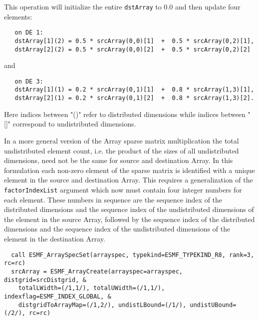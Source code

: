 
   This operation will initialize the entire {\tt dstArray} to 0.0 and then 
   update four elements:
  
   \begin{verbatim}
   on DE 1:
   dstArray[1](2) = 0.5 * srcArray(0,0)[1]  +  0.5 * srcArray(0,2)[1],
   dstArray[2](2) = 0.5 * srcArray(0,0)[2]  +  0.5 * srcArray(0,2)[2]
   \end{verbatim}
  
   and
  
   \begin{verbatim}
   on DE 3:
   dstArray[1](1) = 0.2 * srcArray(0,1)[1]  +  0.8 * srcArray(1,3)[1],
   dstArray[2](1) = 0.2 * srcArray(0,1)[2]  +  0.8 * srcArray(1,3)[2].
   \end{verbatim}
  
   Here indices between "()" refer to distributed dimensions while indices
   between "[]" correspond to undistributed dimensions. 

   In a more general version of the Array sparse matrix multiplication the
   total undistributed element count, i.e. the product of the sizes 
   of all undistributed dimensions, need not be the same for source and
   destination Array. In this formulation each non-zero element of the sparse
   matrix is identified with a unique element in the source and destination
   Array. This requires a generalization of the {\tt factorIndexList} argument
   which now must contain four integer numbers for each element. These numbers
   in sequence are the sequence index of the distributed dimensions and the
   sequence index of the undistributed dimensions of the element in the source
   Array, followed by the sequence index of the distributed dimensions and
   the sequence index of the undistributed dimensions of the element in the
   destination Array. 

 \begin{verbatim}
  call ESMF_ArraySpecSet(arrayspec, typekind=ESMF_TYPEKIND_R8, rank=3, rc=rc)
  srcArray = ESMF_ArrayCreate(arrayspec=arrayspec, distgrid=srcDistgrid, &
    totalLWidth=(/1,1/), totalUWidth=(/1,1/), indexflag=ESMF_INDEX_GLOBAL, &
    distgridToArrayMap=(/1,2/), undistLBound=(/1/), undistUBound=(/2/), rc=rc)
 
\end{verbatim}
 
